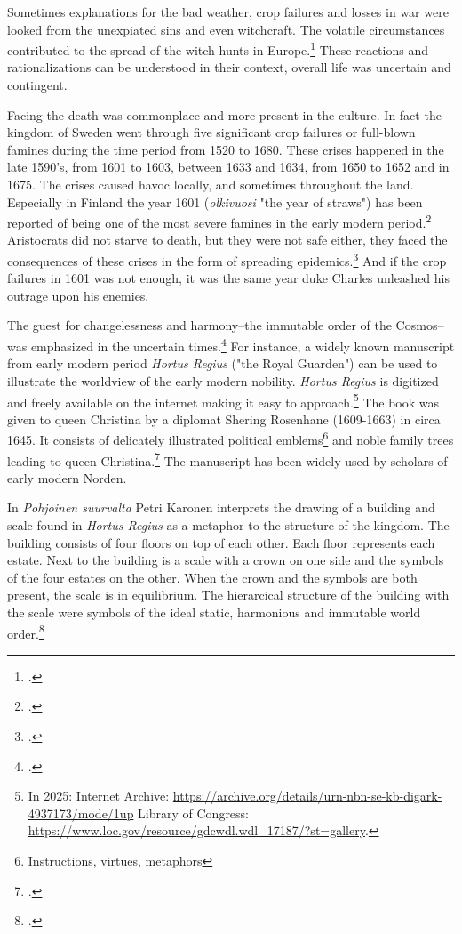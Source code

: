 Sometimes explanations for the bad weather, crop failures and losses in war were looked from the unexpiated sins and even witchcraft. The volatile circumstances contributed to the spread of the witch hunts in Europe.\footcite[pp. 23-29]{lappalainen12} These reactions and rationalizations can be understood in their context, overall life was uncertain and contingent. 

Facing the death was commonplace and more present in the culture. In fact the kingdom of Sweden went through five significant crop failures or full-blown famines during the time period from 1520 to 1680. These crises happened in the late 1590's, from 1601 to 1603, between 1633 and 1634, from 1650 to 1652 and in 1675. The crises caused havoc locally, and sometimes throughout the land. Especially in Finland the year 1601 (\textit{olkivuosi} "the year of straws") has been reported of being one of the most severe famines in the early modern period.\footcite[pp. 9-11.]{dribeEtAll} Aristocrats did not starve to death, but they were not safe either, they faced the consequences of these crises in the form of spreading epidemics.\footcite[p. 159.]{lappalainen06} And if the crop failures in 1601 was not enough, it was the same year duke Charles unleashed his outrage upon his enemies.

The guest for changelessness and harmony–the immutable order of the Cosmos–was emphasized in the uncertain times.\footcite[p. 150.]{hakanenEtAll2020} For instance, a widely known manuscript from early modern period \textit{Hortus Regius} ("the Royal Guarden") can be used to illustrate the worldview of the early modern nobility. \textit{Hortus Regius} is digitized and freely available on the internet making it easy to approach.\footnote{In 2025: Internet Archive: \url{https://archive.org/details/urn-nbn-se-kb-digark-4937173/mode/1up} Library of Congress: \url{https://www.loc.gov/resource/gdcwdl.wdl\_17187/?st=gallery}.} The book was given to queen Christina by a diplomat Shering Rosenhane (1609-1663) in circa 1645. It consists of delicately illustrated political emblems\footnote{Instructions, virtues, metaphors} and noble family trees leading to queen Christina.\footcites{congresslibrary}[p. 271.]{BlennowAnna} The manuscript has been widely used by scholars of early modern Norden.

In \textit{Pohjoinen suurvalta} Petri Karonen interprets the drawing of a building and scale found in \textit{Hortus Regius} as a metaphor to the structure of the kingdom. The building consists of four floors on top of each other. Each floor represents each estate. Next to the building is a scale with a crown on one side and the symbols of the four estates on the other. When the crown and the symbols are both present, the scale is in equilibrium. The hierarcical structure of the building with the scale were symbols of the ideal static, harmonious and immutable world order.\footcite[pp. 162-165.]{pSuurvalta}

